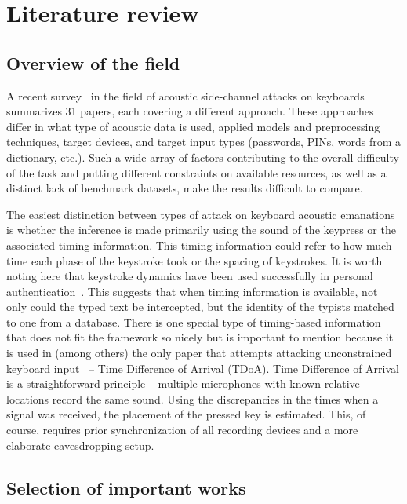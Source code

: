 \documentclass[../main.tex]{subfiles}
\begin{document}
\chapter{Literature review}\label{cha:literature_review}
\section{Overview of the field}
\label{sec:overview_of_the_field}
A recent survey~\cite{survey2023} in the field of acoustic side-channel attacks on keyboards summarizes 31 papers, each covering a different approach. These approaches differ in what type of acoustic data is used, applied models and preprocessing techniques, target devices, and target input types (passwords, PINs, words from a dictionary, etc.).
Such a wide array of factors contributing to the overall difficulty of the task and putting different constraints on available resources, as well as a distinct lack of benchmark datasets, make the results difficult to compare.  

The easiest distinction between types of attack on keyboard acoustic emanations is whether the inference is made primarily using the sound of the keypress or the associated timing information. This timing information could refer to how much time each phase of the keystroke took or the spacing of keystrokes. It is worth noting here that keystroke dynamics have been used successfully in personal authentication~\cite{kbd-biometrics2011}. This suggests that when timing information is available, not only could the typed text be intercepted, but the identity of the typists matched to one from a database.
There is one special type of timing-based information that does not fit the framework so nicely but is important to mention because it is used in (among others) the only paper that attempts attacking unconstrained keyboard input~\cite{unconstrained2023} -- Time Difference of Arrival (TDoA).
Time Difference of Arrival is a straightforward principle -- multiple microphones with known relative locations record the same sound. Using the discrepancies in the times when a signal was received, the placement of the pressed key is estimated. This, of course, requires prior synchronization of all recording devices and a more elaborate eavesdropping setup. 

\section{Selection of important works}
\end{document}
